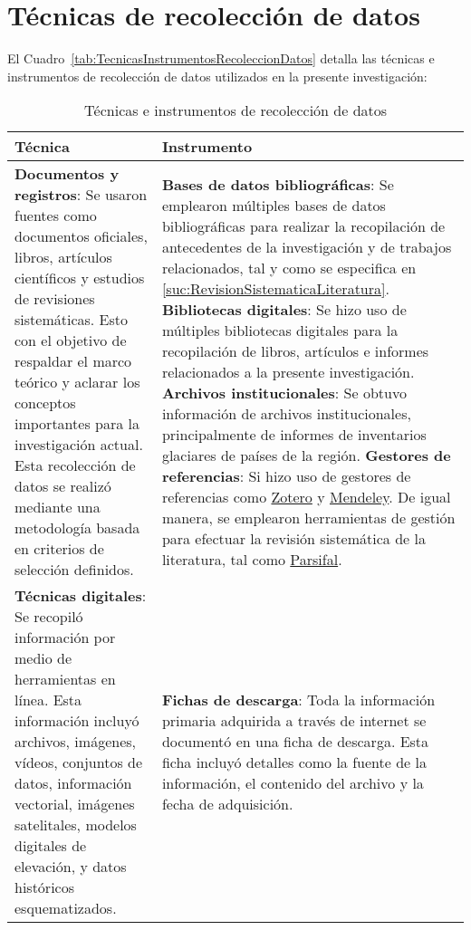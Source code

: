 \section{Técnicas de recolección de datos}
\label{sec:TecnicaRecoleccionDatos}

El Cuadro~\ref{tab:TecnicasInstrumentosRecoleccionDatos} detalla las técnicas e instrumentos de recolección de datos utilizados en la presente investigación:

\begin{table}
\caption{Técnicas e instrumentos de recolección de datos}
\small
\begin{tabularx}{1\textwidth}{XX} 
\hline
\textbf{Técnica} & \textbf{Instrumento} \\ \hline
    \textbf{Documentos y registros}: Se usaron fuentes como documentos oficiales, libros, artículos científicos y estudios de revisiones sistemáticas. Esto con el objetivo de respaldar el marco teórico y aclarar los conceptos importantes para la investigación actual. Esta recolección de datos se realizó mediante una metodología basada en criterios de selección definidos. & \textbf{Bases de datos bibliográficas}: Se emplearon múltiples bases de datos bibliográficas para realizar la recopilación de antecedentes de la investigación y de trabajos relacionados, tal y como se especifica en \ref{suc:RevisionSistematicaLiteratura}. \newline \textbf{Bibliotecas digitales}: Se hizo uso de múltiples bibliotecas digitales para la recopilación de libros, artículos e informes relacionados a la presente investigación. \newline  \textbf{Archivos institucionales}: Se obtuvo información de archivos institucionales, principalmente de informes de inventarios glaciares de países de la región. \newline  \textbf{Gestores de referencias}: Si hizo uso de gestores de referencias como \href{https://www.zotero.org/}{Zotero} y \href{https://www.mendeley.com/}{Mendeley}. De igual manera, se emplearon herramientas de gestión para efectuar la revisión sistemática de la literatura, tal como \href{https://parsif.al/}{Parsifal}.\\ \hline
\textbf{Técnicas digitales}: Se recopiló información por medio de herramientas en línea. Esta información incluyó archivos, imágenes, vídeos, conjuntos de datos, información vectorial, imágenes satelitales, modelos digitales de elevación, y datos históricos esquematizados. & \textbf{Fichas de descarga}: Toda la información primaria adquirida a través de internet se documentó en una ficha de descarga. Esta ficha incluyó detalles como la fuente de la información, el contenido del archivo y la fecha de adquisición. \\ \hline

\end{tabularx}
\end{table}
